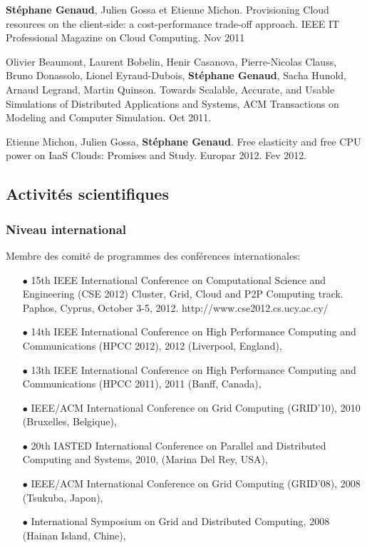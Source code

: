 \documentclass[11pt]{article}
\begin{document}
\begin{thebibliography}{99}
\newblock \textbf{Stéphane Genaud}, Julien Gossa et Etienne Michon.
\newblock Provisioning Cloud resources on the client-side: a cost-performance trade-off approach.
IEEE IT Professional Magazine on Cloud Computing. Nov 2011

Olivier Beaumont, Laurent Bobelin, Henir Casanova, Pierre-Nicolas Clauss, 
Bruno Donassolo, Lionel Eyraud-Dubois, \textbf{Stéphane Genaud}, Sacha Hunold, 
Arnaud Legrand, Martin Quinson.
\newblock
Towards Scalable, Accurate, and Usable Simulations of Distributed Applications and Systems,
ACM Transactions on Modeling and Computer Simulation. Oct 2011.

Etienne Michon, Julien Gossa, \textbf{Stéphane Genaud}.
\newblock Free elasticity and free CPU power on IaaS Clouds: Promises and Study.
Europar 2012. Fev 2012.
\end{thebibliography}


\subsection{Activités scientifiques}

\subsubsection{Niveau international}
Membre des comité de programmes des conférences internationales:\\[-3mm]
\begin{itemize}
\item[$\bullet$]
15th IEEE International Conference on Computational Science and Engineering (CSE 2012) 
Cluster, Grid, Cloud and P2P Computing track. Paphos, Cyprus, October 3-5, 2012. 
http://www.cse2012.cs.ucy.ac.cy/

\item[$\bullet$] 
14th IEEE International Conference on High Performance Computing and Communications (HPCC 2012), 
2012 (Liverpool, England),
\item[$\bullet$] 
13th IEEE International Conference on High Performance Computing and Communications (HPCC 2011), 
2011 (Banff, Canada),
\item[$\bullet$] 
IEEE/ACM International Conference on Grid Computing (GRID'10), 2010 (Bruxelles, Belgique),
\item[$\bullet$] 
20th IASTED International Conference on Parallel and Distributed Computing and Systems, 2010, (Marina Del Rey, USA),
\item[$\bullet$] 
IEEE/ACM International Conference on Grid Computing (GRID'08), 2008 (Tsukuba, Japon), 
\item [$\bullet$]
International Symposium on Grid and Distributed Computing, 2008 (Hainan Island, Chine),\\
\end{itemize}
\end{document}

